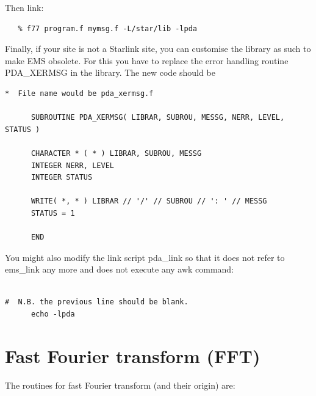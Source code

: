 \documentclass[11pt,twoside]{article}
\newcommand{\htmlref}[2]{#1}
\newcommand{\xlabel}[1]{}
\begin{document}
   Then link:

\begin{verbatim}
   % f77 program.f mymsg.f -L/star/lib -lpda
\end{verbatim}

   Finally, if your site is not a Starlink site, you can
   customise the library as such to make EMS obsolete. For this you have
   to replace the error handling routine
\htmlref{PDA\_XERMSG}{PDA\_XERMSG}
   in the library. The new code should be

\begin{verbatim}
*  File name would be pda_xermsg.f

      SUBROUTINE PDA_XERMSG( LIBRAR, SUBROU, MESSG, NERR, LEVEL, STATUS )

      CHARACTER * ( * ) LIBRAR, SUBROU, MESSG
      INTEGER NERR, LEVEL
      INTEGER STATUS

      WRITE( *, * ) LIBRAR // '/' // SUBROU // ': ' // MESSG
      STATUS = 1

      END
\end{verbatim}

   You might also modify the link script pda\_link so that it does not
   refer to ems\_link any more and does not execute any awk command:

\begin{verbatim}

#  N.B. the previous line should be blank.
      echo -lpda
\end{verbatim}


\section{\xlabel{fast_fourier_transform_fft}Fast Fourier transform (FFT)}

   The routines for fast Fourier transform (and their origin) are:
\end{document}

